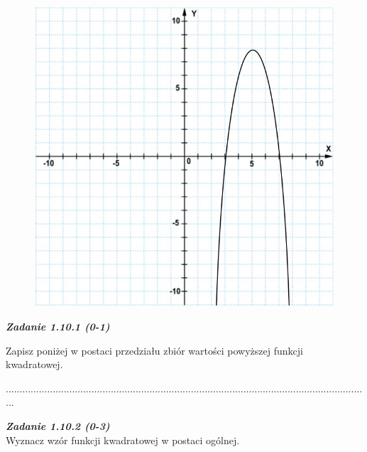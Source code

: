 \documentclass[12pt,a4paper]{article}
\theoremstyle{break}
\begin{document}
		\begin{figure}[h]
			\centering
			\includegraphics[scale=0.7]{pm1.jpeg}
		\end{figure}

		\begin{mdframed}[%
			linecolor=white,%
			innertopmargin=\topskip,
			shadowsize=0,%
			innertopmargin=5,%
			innerbottommargin=5,%
			leftmargin=10,%
			rightmargin=10,%
			backgroundcolor=gray!20,%
			innertopmargin=0pt,]
			\vspace{0.2cm}
			\textbf{\textit{Zadanie 1.10.1 (0-1)}}
			
			
		\end{mdframed}
	
		Zapisz poniżej w postaci przedziału zbiór wartości powyższej funkcji kwadratowej. \vspace{1cm}
		
		....................................................................................................................................
		
		\begin{mdframed}[%
			linecolor=white,%
			innertopmargin=\topskip,
			shadowsize=0,%
			innertopmargin=5,%
			innerbottommargin=5,%
			leftmargin=10,%
			rightmargin=10,%
			backgroundcolor=gray!20,%
			innertopmargin=0pt,]
			\vspace{0.2cm}
			\textbf{\textit{Zadanie 1.10.2 (0-3)}}
			\\
			Wyznacz wzór funkcji kwadratowej w postaci ogólnej.
		\end{mdframed}
	
\end{document}
